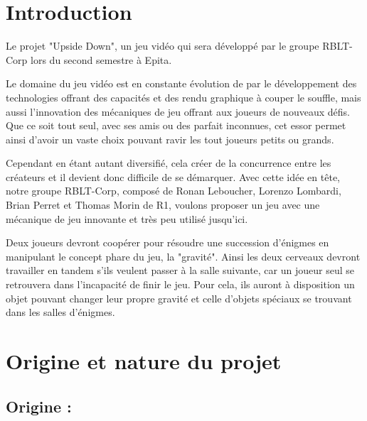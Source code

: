 \documentclass[a4paper,11pt]{article}
\begin{document}
  



\newpage

\tableofcontents

\newpage


\section{Introduction}

Le projet "Upside Down", un jeu vidéo qui sera développé par le groupe RBLT-Corp lors 
du second semestre à Epita.\newline

Le domaine du jeu vidéo est en constante évolution de par le développement des technologies
offrant des capacités et des rendu graphique à couper le souffle, mais aussi l'innovation des
mécaniques de jeu offrant aux joueurs de nouveaux défis.
Que ce soit tout seul, avec ses amis ou des parfait inconnues, cet essor permet ainsi d'avoir 
un vaste choix pouvant ravir les tout joueurs petits ou grands.\newline

Cependant en étant autant diversifié, cela créer de la concurrence entre les créateurs et il devient
donc difficile de se démarquer.
Avec cette idée en tête, notre groupe RBLT-Corp, composé de Ronan Leboucher, Lorenzo Lombardi, Brian Perret et Thomas Morin de R1, 
voulons proposer un jeu avec une mécanique de jeu innovante et très peu utilisé jusqu'ici. \newline

Deux joueurs devront coopérer pour résoudre une succession d'énigmes en manipulant le concept phare du jeu, la "gravité".
Ainsi les deux cerveaux devront travailler en tandem s'ils veulent passer à la salle suivante, car un joueur seul se retrouvera
dans l'incapacité de finir le jeu. Pour cela, ils auront à disposition un objet pouvant changer leur propre gravité et celle d'objets
spéciaux se trouvant dans les salles d'énigmes.




\section{Origine et nature du projet}

\subsection{Origine :}
\end{document}
